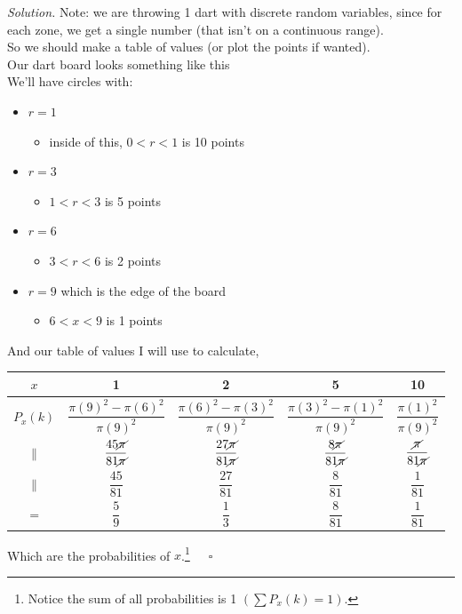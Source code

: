 \documentclass[12pt]{book}
\begin{document}
\noindent \textit{Solution.}
Note: we are throwing 1 dart with discrete random variables, since for each zone, we get a single number (that isn't on a continuous range).\\
So we should make a table of values (or plot the points if wanted).\\
Our dart board looks something like this\\
We'll have circles with:
\begin{itemize}
\item $r=1$
\begin{itemize}
\item inside of this, $0<r<1$ is 10 points
\end{itemize}
\item $r=3$
\begin{itemize}
\item $1<r<3$ is 5 points
\end{itemize}
\item $r=6$
\begin{itemize}
\item $3<r<6$ is 2 points
\end{itemize}
\item $r=9$ which is the edge of the board
\begin{itemize}
\item $6<x<9$ is 1 points
\end{itemize}
\end{itemize}

%
%
%
%
%
%
%
%
And our table of values I will use to calculate, 
\small
\begin{center}
\begin{tabular}{|c|c|c|c|c|}
\hline
	$x$ & 1 & 2 & 5 & 10 \\
\hline
 $P_{x}(k)$ & $\dfrac{\pi (9)^{2} - \pi (6)^{2}}{\pi (9)^{2}}$ & $\dfrac{\pi (6)^{2} - \pi (3)^{2}}{\pi (9)^{2}}$ & $\dfrac{\pi (3)^{2} - \pi (1)^{2}}{\pi (9)^{2}}$ & $\dfrac{\pi (1)^{2}}{\pi (9)^{2}}$   \\
\hline
	$\parallel$ & $\dfrac{45\cancel\pi}{81\cancel\pi}$           & $\dfrac{27\cancel\pi}{81\cancel\pi}$           & $\dfrac{8\cancel\pi}{81\cancel\pi}$            & $\dfrac{\cancel\pi}{81\cancel\pi}$ \\
\hline
	$\parallel$ & $\dfrac{45}{81}$ & $\dfrac{27}{81}$ & $\dfrac{8}{81}$ & $\dfrac{1}{81}$ \\
\hline
	$=$ & $\dfrac{5}{9}$ & $\dfrac{1}{3}$ & $\dfrac{8}{81}$ & $\dfrac{1}{81}$\\
\hline
\end{tabular}
\end{center}
\normalsize
Which are the probabilities of $x$.\footnote{Notice the sum of all probabilities is 1 $\left(\sum P_{x}(k)=1\right)$.}~~~$\square$
\end{document}
